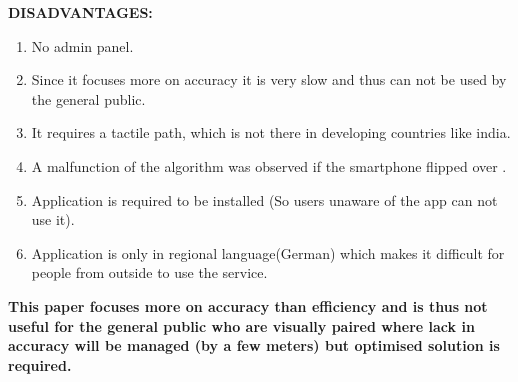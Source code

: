 ﻿\documentclass[a4paper, 12pt]{article}
\begin{document}
\textbf{DISADVANTAGES:}
\begin{enumerate}
	\item No admin panel.
	\item Since it focuses more on accuracy it is very slow and thus can not be used by the general public.
	\item It requires a tactile path, which is not there in developing countries like india.
	\item A malfunction of the algorithm was observed if the smartphone ﬂipped over .
	\item Application is required to be installed (So users unaware of the app can not use it).
	\item  Application is only in regional language(German) which makes it difficult for people from outside to use the service.	
\end{enumerate}
\textbf{This paper focuses more on accuracy than efficiency and is thus not useful for the general public who are visually paired where lack in accuracy will be  managed (by a few meters) but optimised solution is required.}
\end{document}
